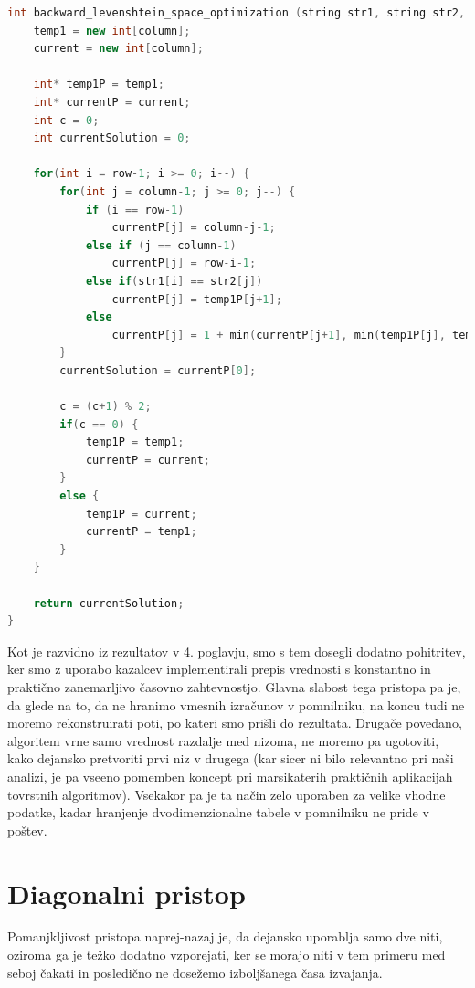 \documentclass[a4paper,12pt,openright]{book}
\begin{document}
\bigskip
\bigskip

\begin{lstlisting}[language=C++, caption={Prostorska optimizacija za računanje Levenshteinove razdalje s pristopom nazaj.}, captionpos=b, label=spaceOptimization]
int backward_levenshtein_space_optimization (string str1, string str2, int row, int column) {
    temp1 = new int[column];
    current = new int[column];

    int* temp1P = temp1;
    int* currentP = current;
    int c = 0;
    int currentSolution = 0;

    for(int i = row-1; i >= 0; i--) {
        for(int j = column-1; j >= 0; j--) {
            if (i == row-1)
                currentP[j] = column-j-1;
            else if (j == column-1)
                currentP[j] = row-i-1;
            else if(str1[i] == str2[j])
                currentP[j] = temp1P[j+1];
            else
                currentP[j] = 1 + min(currentP[j+1], min(temp1P[j], temp1P[j+1]));
        }
        currentSolution = currentP[0];

        c = (c+1) % 2;
        if(c == 0) {
            temp1P = temp1;
            currentP = current;
        }
        else {
            temp1P = current;
            currentP = temp1;
        }
    }

    return currentSolution;
}
\end{lstlisting}

\bigskip
\bigskip

Kot je razvidno iz rezultatov v 4. poglavju, smo s tem dosegli dodatno pohitritev, ker smo z uporabo kazalcev implementirali prepis vrednosti s konstantno in praktično zanemarljivo časovno zahtevnostjo. Glavna slabost tega pristopa pa je, da glede na to, da ne hranimo vmesnih izračunov v pomnilniku, na koncu tudi ne moremo rekonstruirati poti, po kateri smo prišli do rezultata. Drugače povedano, algoritem vrne samo vrednost razdalje med nizoma, ne moremo pa ugotoviti, kako dejansko pretvoriti prvi niz v drugega (kar sicer ni bilo relevantno pri naši analizi, je pa vseeno pomemben koncept pri marsikaterih praktičnih aplikacijah tovrstnih algoritmov). Vsekakor pa je ta način zelo uporaben za velike vhodne podatke, kadar hranjenje dvodimenzionalne tabele v pomnilniku ne pride v poštev. 


\section{Diagonalni pristop}

Pomanjkljivost pristopa naprej-nazaj je, da dejansko uporablja samo dve niti, oziroma ga je težko dodatno vzporejati, ker se morajo niti v tem primeru med seboj čakati in posledično ne dosežemo izboljšanega časa izvajanja. 
\end{document}
